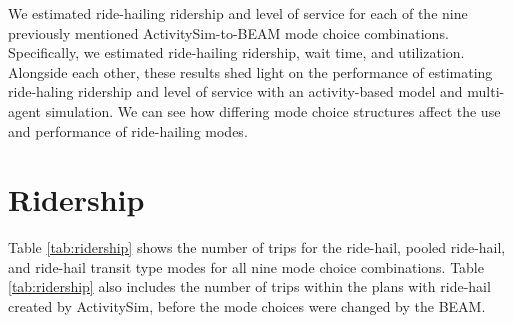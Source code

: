 \documentclass[fancy, masters]{byuthesis}
\begin{document}
We estimated ride-hailing ridership and level of service for each of the nine previously mentioned ActivitySim-to-BEAM mode choice combinations. Specifically, we estimated ride-hailing ridership, wait time, and utilization. Alongside each other, these results shed light on the performance of estimating ride-haling ridership and level of service with an activity-based model and multi-agent simulation. We can see how differing mode choice structures affect the use and performance of ride-hailing modes.

\hypertarget{res-ridership}{%
\section{Ridership}\label{res-ridership}}

Table \ref{tab:ridership} shows the number of trips for the ride-hail, pooled ride-hail, and ride-hail transit type modes for all nine mode choice combinations. Table \ref{tab:ridership} also includes the number of trips within the plans with ride-hail created by ActivitySim, before the mode choices were changed by the BEAM.
\end{document}
